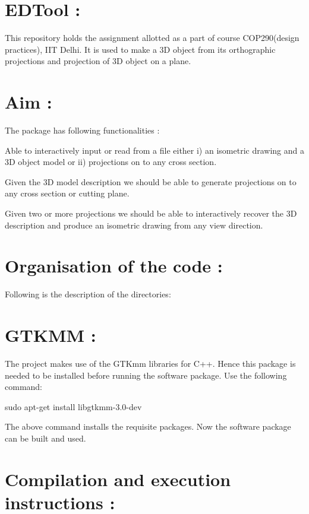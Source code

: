 \section*{E\+D\+Tool \+:}

This repository holds the assignment allotted as a part of course C\+O\+P290(design practices), I\+IT Delhi. It is used to make a 3D object from it\textquotesingle{}s orthographic projections and projection of 3D object on a plane.

\section*{Aim \+:}

The package has following functionalities \+:
\begin{DoxyEnumerate}
\item Able to interactively input or read from a file either i) an isometric drawing and a 3D object model or ii) projections on to any cross section.
\item Given the 3D model description we should be able to generate projections on to any cross section or cutting plane.
\item Given two or more projections we should be able to interactively recover the 3D description and produce an isometric drawing from any view direction.
\end{DoxyEnumerate}

\section*{Organisation of the code \+:}

Following is the description of the directories\+:

\section*{G\+T\+K\+MM \+:}

The project makes use of the G\+T\+Kmm libraries for C++. Hence this package is needed to be installed before running the software package. Use the following command\+: 
\begin{DoxyCode}
sudo apt-get install libgtkmm-3.0-dev
\end{DoxyCode}
 The above command installs the requisite packages. Now the software package can be built and used.

\section*{Compilation and execution instructions \+:}

